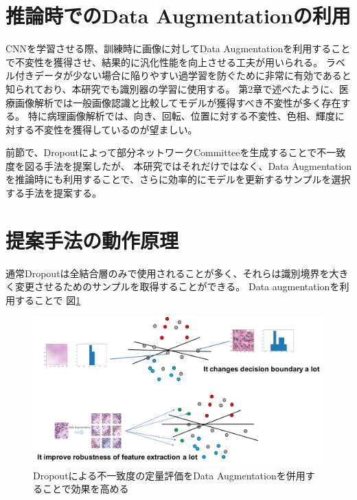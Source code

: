 \section{推論時でのData Augmentationの利用}
CNNを学習させる際、訓練時に画像に対してData Augmentationを利用することで不変性を獲得させ、結果的に汎化性能を向上させる工夫が用いられる。
ラベル付きデータが少ない場合に陥りやすい過学習を防ぐために非常に有効であると知られており、本研究でも識別器の学習に使用する。
第2章で述べたように、医療画像解析では一般画像認識と比較してモデルが獲得すべき不変性が多く存在する。
特に病理画像解析では、向き、回転、位置に対する不変性、色相、輝度に対する不変性を獲得しているのが望ましい。

前節で、Dropoutによって部分ネットワークCommitteeを生成することで不一致度を図る手法を提案したが、
本研究ではそれだけではなく、Data Augmentationを推論時にも利用することで、さらに効率的にモデルを更新するサンプルを選択する手法を提案する。

\section{提案手法の動作原理}
通常Dropoutは全結合層のみで使用されることが多く、それらは識別境界を大きく変更させるためのサンプルを取得することができる。
Data augmentationを利用することで
図\ref{fig:how_it_works}


\begin{figure}[tbp]
    \label{fig:how_it_works}
     \begin{center}
      \includegraphics[width=120mm]{figures/how_it_works.pdf}
     \end{center}
    \caption{Dropoutによる不一致度の定量評価をData Augmentationを併用することで効果を高める}
\end{figure}


